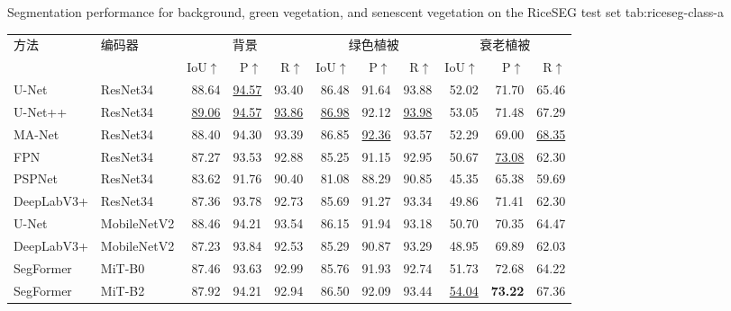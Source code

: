 \begin{table}[!htb]
  \centering
    {Segmentation performance for background, green vegetation, and senescent vegetation on the RiceSEG test set}
    {tab:riceseg-class-a}
  \begin{spacing}{1.2}
    \small
    \setlength{\tabcolsep}{1.5pt}
    \renewcommand{\arraystretch}{1.15}
    \begin{tabular*}{\linewidth}{@{\extracolsep{\fill}}ll*{9}{r}@{}}
      \toprule
      方法 & 编码器 & \multicolumn{3}{c}{背景}
        & \multicolumn{3}{c}{绿色植被} & \multicolumn{3}{c}{衰老植被} \\
      \cmidrule(lr){3-5}\cmidrule(lr){6-8}\cmidrule(lr){9-11}
      & & IoU\(\uparrow\) & P\(\uparrow\) & R\(\uparrow\)
        & IoU\(\uparrow\) & P\(\uparrow\) & R\(\uparrow\)
        & IoU\(\uparrow\) & P\(\uparrow\) & R\(\uparrow\) \\
      \midrule
      U-Net & ResNet34
        & 88.64 & \underline{94.57} & 93.40 & 86.48 & 91.64 & 93.88 & 52.02 & 71.70 & 65.46 \\
      U-Net++ & ResNet34
        & \underline{89.06} & \underline{94.57} & \underline{93.86}
        & \underline{86.98} & 92.12 & \underline{93.98} & 53.05 & 71.48 & 67.29 \\
      MA-Net & ResNet34
        & 88.40 & 94.30 & 93.39 & 86.85 & \underline{92.36} & 93.57
        & 52.29 & 69.00 & \underline{68.35} \\
      FPN & ResNet34
        & 87.27 & 93.53 & 92.88 & 85.25 & 91.15 & 92.95 & 50.67 & \underline{73.08} & 62.30 \\
      PSPNet & ResNet34
        & 83.62 & 91.76 & 90.40 & 81.08 & 88.29 & 90.85 & 45.35 & 65.38 & 59.69 \\
      DeepLabV3+ & ResNet34
        & 87.36 & 93.78 & 92.73 & 85.69 & 91.27 & 93.34 & 49.86 & 71.41 & 62.30 \\
      U-Net & MobileNetV2
        & 88.46 & 94.21 & 93.54 & 86.15 & 91.94 & 93.18 & 50.70 & 70.35 & 64.47 \\
      DeepLabV3+ & MobileNetV2
        & 87.23 & 93.84 & 92.53 & 85.29 & 90.87 & 93.29 & 48.95 & 69.89 & 62.03 \\
      SegFormer & MiT-B0
        & 87.46 & 93.63 & 92.99 & 85.76 & 91.93 & 92.74 & 51.73 & 72.68 & 64.22 \\
      SegFormer & MiT-B2
        & 87.92 & 94.21 & 92.94 & 86.50 & 92.09 & 93.44
        & \underline{54.04} & \textbf{73.22} & 67.36 \\

\end{tabular*}
\end{spacing}
\end{table}
